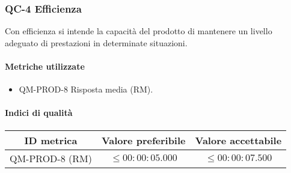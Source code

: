 \subsubsection{QC-4 Efficienza}
Con efficienza si intende la capacità del prodotto di mantenere un livello adeguato di prestazioni in determinate situazioni.
	
	\paragraph{Metriche utilizzate}
	\begin{itemize}
		\item QM-PROD-8 Risposta media (RM).
	\end{itemize}

	\paragraph{Indici di qualità}
	\begin{center}
		\begin{tabular}{|c|c|c|}
			\rowcolor{lighter-grayer}
			\hline
			\textbf{ID metrica} & \textbf{Valore preferibile} & \textbf{Valore accettabile} \\
			\hline
			QM-PROD-8 (RM) & \(\le 00:00:05.000\) & \(\le 00:00:07.500\) \\
			\hline
		\end{tabular}
	\end{center}
